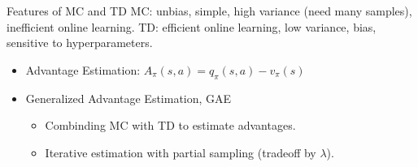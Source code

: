 \begin{frame}
    \begin{block}{Features of MC and TD}
        MC: unbias, simple, high variance (need many samples), inefficient online learning.
        TD: efficient online learning, low variance, bias, sensitive to hyperparameters.
    \end{block}
    \begin{itemize}
        \item Advantage Estimation: $A_\pi(s,a) = q_\pi(s, a) - v_\pi(s)$
        \item Generalized Advantage Estimation, GAE
        \begin{itemize}
            \item Combinding MC with TD to estimate advantages.
            \item Iterative estimation with partial sampling (tradeoff by $\lambda$).
        \end{itemize}
    \end{itemize}
\end{frame}

